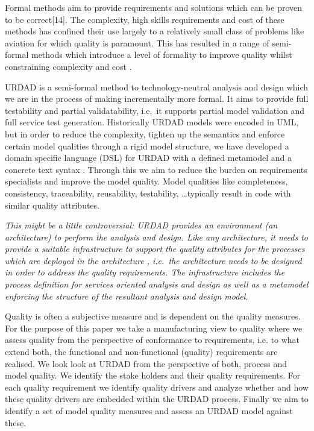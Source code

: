 Formal methods aim to provide requirements and solutions which can be proven to be correct[14]. The complexity, high skills requirements and cost of these methods \cite{} has confined their use largely to a relatively small class of problems like aviation \cite{Hall} for which quality is paramount. This has resulted in a range of semi-formal methods which introduce a level of formality to improve quality whilst constraining complexity and cost \cite{}.

URDAD is a semi-formal method to technology-neutral analysis and design \cite{solms_urdad_2010} which we are in the process of making incrementally more formal. It aims to provide full testability and partial validatability, i.e.\ it supports partial model validation and full service test generation. Historically URDAD models were encoded in UML, but in order to reduce the complexity, tighten up the semantics and enforce certain model qualities through a rigid model structure, we have developed a domain specific language (DSL) for URDAD with a defined metamodel and a concrete text syntax \cite{solmsfritz_domain-specific_????}. Through this we aim to reduce the burden on requirements specialists and improve the model quality. Model qualities like completeness, consistency, traceability, reusability, testability, \dots typically result in code with similar quality attributes\cite{findItIfYouCan}.

\emph{This might be a little controversial: URDAD provides an environment (an architecture) to perform the analysis and design. Like any architecture, it needs to provide a suitable infrastructure to support the quality attributes for the processes which are deployed in the architecture \cite{}, i.e.\ the architecture needs to be designed in order to address the quality requirements. The infrastructure includes the process definition for services oriented analysis and design as well as a metamodel enforcing the structure of the resultant analysis and design model.}

Quality is often a subjective measure and is dependent on the quality measures. For the purpose of this paper we take a manufacturing view \cite{garvin_what_1984} to quality where we assess quality from the perspective of conformance to requirements, i.e. to what extend both, the functional and non-functional (quality) requirements are realised. We look look at URDAD from the perspective of both, process and model quality. We identify the stake holders and their quality requirements. For each quality requirement we identify quality drivers and analyze whether and how these quality drivers are embedded within the URDAD process. Finally we aim to identify a set of model quality measures and assess an URDAD model against these.



